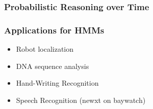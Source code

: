 \begin{frame}
  \frametitle{Probabilistic Reasoning over Time}
  
  
\end{frame}


\begin{frame}
  \frametitle{Applications for HMMs}
  \begin{itemize}[<+->]
  \item Robot localization
  \item DNA sequence analysis
  \item Hand-Writing Recognition
  \item Speech Recognition (newxt on baywatch)
  \end{itemize}
\end{frame}
